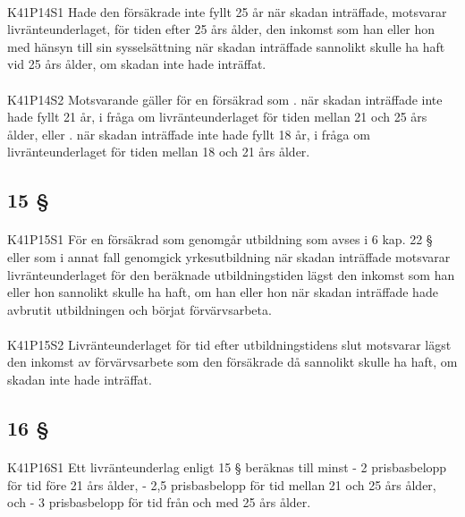 \documentclass[a4paper,notitlepage,openany,10pt]{book}
\begin{document}
\paragraph*{}
{\tiny K41P14S1}
Hade den försäkrade inte fyllt 25 år när skadan inträffade, motsvarar livränteunderlaget, för tiden efter 25 års ålder, den inkomst som han eller hon med hänsyn till sin sysselsättning när skadan inträffade sannolikt skulle ha haft vid 25 års ålder, om skadan inte hade inträffat.
\paragraph*{}
{\tiny K41P14S2}
Motsvarande gäller för en försäkrad som
. när skadan inträffade inte hade fyllt 21 år, i fråga om livränteunderlaget för tiden mellan 21 och 25 års ålder, eller
. när skadan inträffade inte hade fyllt 18 år, i fråga om livränteunderlaget för tiden mellan 18 och 21 års ålder.
\subsection*{15 §}
\paragraph*{}
{\tiny K41P15S1}
För en försäkrad som genomgår utbildning som avses i 6 kap. 22 § eller som i annat fall genomgick yrkesutbildning när skadan inträffade motsvarar livränteunderlaget för den beräknade utbildningstiden lägst den inkomst som han eller hon sannolikt skulle ha haft, om han eller hon när skadan inträffade hade avbrutit utbildningen och börjat förvärvsarbeta.
\paragraph*{}
{\tiny K41P15S2}
Livränteunderlaget för tid efter utbildningstidens slut motsvarar lägst den inkomst av förvärvsarbete som den försäkrade då sannolikt skulle ha haft, om skadan inte hade inträffat.
\subsection*{16 §}
\paragraph*{}
{\tiny K41P16S1}
Ett livränteunderlag enligt 15 § beräknas till minst
\newline - 2 prisbasbelopp för tid före 21 års ålder,
\newline - 2,5 prisbasbelopp för tid mellan 21 och 25 års ålder, och
\newline - 3 prisbasbelopp för tid från och med 25 års ålder.
\end{document}
